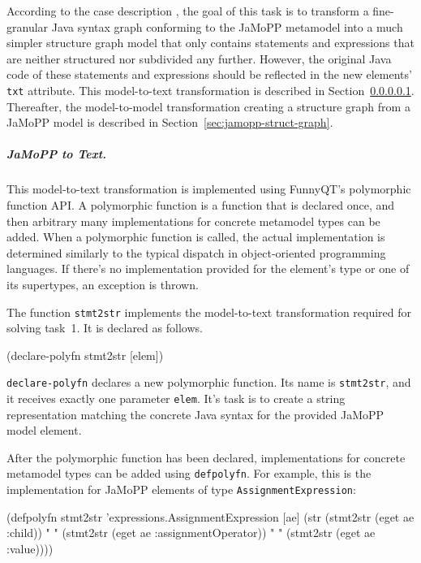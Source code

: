 \documentclass[submission]{eptcs}
\begin{document}
According to the case description \cite{flowgraphcasedesc}, the goal of this
task is to transform a fine-granular Java syntax graph conforming to the JaMoPP
metamodel \cite{jamopp09} into a much simpler structure graph model that only
contains statements and expressions that are neither structured nor subdivided
any further.  However, the original Java code of these statements and
expressions should be reflected in the new elements' \verb|txt| attribute.
This model-to-text transformation is described in
Section~\ref{sec:jamopp-text}.  Thereafter, the model-to-model transformation
creating a structure graph from a JaMoPP model is described in
Section~\ref{sec:jamopp-struct-graph}.


\subparagraph{JaMoPP to Text.}
\label{sec:jamopp-text}

This model-to-text transformation is implemented using FunnyQT's polymorphic
function API.  A polymorphic function is a function that is declared once, and
then arbitrary many implementations for concrete metamodel types can be added.
When a polymorphic function is called, the actual implementation is determined
similarly to the typical dispatch in object-oriented programming languages.  If
there's no implementation provided for the element's type or one of its
supertypes, an exception is thrown.

The function \verb|stmt2str| implements the model-to-text transformation
required for solving task~1.  It is declared as follows.

\begin{clojurecode}
(declare-polyfn stmt2str [elem])
\end{clojurecode}

\verb|declare-polyfn| declares a new polymorphic function.  Its name is
\verb|stmt2str|, and it receives exactly one parameter \verb|elem|.  It's task
is to create a string representation matching the concrete Java syntax for the
provided JaMoPP model element.

After the polymorphic function has been declared, implementations for concrete
metamodel types can be added using \verb|defpolyfn|.  For example, this is the
implementation for JaMoPP elements of type \verb|AssignmentExpression|:

\begin{clojurecode}
(defpolyfn stmt2str 'expressions.AssignmentExpression [ae]
  (str (stmt2str (eget ae :child)) " "
       (stmt2str (eget ae :assignmentOperator)) " "
       (stmt2str (eget ae :value))))
\end{clojurecode}
\end{document}
